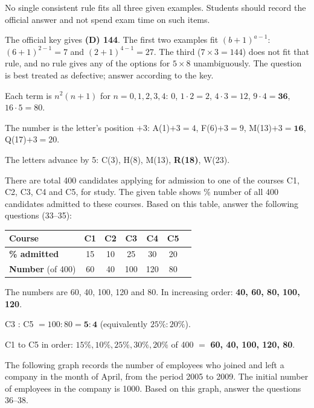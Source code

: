 No single consistent rule fits all three given examples. Students should record the official answer and not spend exam time on such items.

The official key gives \textbf{(D) 144}. The first two examples fit $(b+1)^{a-1}$: $(6+1)^{2-1}=7$ and $(2+1)^{4-1}=27$. The third ($7\times3=144$) does not fit that rule, and no rule gives any of the options for $5\times8$ unambiguously. The question is best treated as defective; answer according to the key.

Each term is $n^2(n+1)$ for $n=0,1,2,3,4$: $0$, $1\cdot2=2$, $4\cdot3=12$, $9\cdot4=\mathbf{36}$, $16\cdot5=80$.

The number is the letter's position $+3$: A(1)$+3=4$, F(6)$+3=9$, M(13)$+3=\mathbf{16}$, Q(17)$+3=20$.

The letters advance by 5: C(3), H(8), M(13), \textbf{R(18)}, W(23).

There are total 400 candidates applying for admission to one of the courses C1, C2, C3, C4 and C5, for study. The given table shows \% number of all 400 candidates admitted to these courses. Based on this table, answer the following questions (33--35):
\begin{center}
\begin{tabular}{lcccccc}\toprule \textbf{Course} & C1 & C2 & C3 & C4 & C5\\\midrule
\textbf{\% admitted} & 15 & 10 & 25 & 30 & 20\\
\textbf{Number} (of 400) & 60 & 40 & 100 & 120 & 80\\\bottomrule
\end{tabular}
\end{center}

The numbers are 60, 40, 100, 120 and 80. In increasing order: \textbf{40, 60, 80, 100, 120}.

C3 : C5 $=100:80=\mathbf{5:4}$ (equivalently $25\%:20\%$).

C1 to C5 in order: $15\%, 10\%, 25\%, 30\%, 20\%$ of 400 $=$ \textbf{60, 40, 100, 120, 80}.

The following graph records the number of employees who joined and left a company in the month of April, from the period 2005 to 2009. The initial number of employees in the company is 1000. Based on this graph, answer the questions 36--38.
\begin{center}
\end{center}

